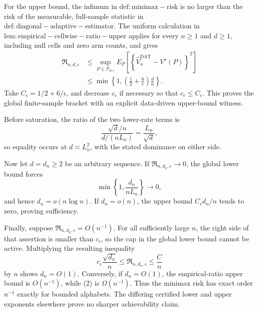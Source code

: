 For the upper bound, the infimum in \(\mathrm{def:minimax-risk}\) is no larger than the risk of the measurable, full-sample statistic in \(\mathrm{def:diagonal-adaptive-estimator}\).  The uniform calculation in \(\mathrm{lem:empirical-cellwise-ratio-upper}\) applies for every \(n\geq1\) and \(d\geq1\), including null cells and zero arm counts, and gives
\[
\begin{aligned}
 \mathfrak R_{n,d,\epsilon}
 &\leq\sup_{P\in\mathcal P_{d,\epsilon}}
 E_P\!\left[
  \left\{\widehat V_n^{\mathrm{DAT}}-V^\star(P)\right\}^2
 \right]\\
 &\leq\min\!\left\{1,
  \left(\frac12+\frac6\epsilon\right)\frac dn
 \right\}.
\end{aligned}
\]
Take \(C_\epsilon=1/2+6/\epsilon\), and decrease \(c_\epsilon\) if necessary so that \(c_\epsilon\leq C_\epsilon\).  This proves the global finite-sample bracket with an explicit data-driven upper-bound witness.

Before saturation, the ratio of the two lower-rate terms is
\[
 \frac{\sqrt d/n}{d/(nL_n)}=\frac{L_n}{\sqrt d},
\]
so equality occurs at \(d\asymp L_n^2\), with the stated dominance on either side.

Now let \(d=d_n\geq2\) be an arbitrary sequence.  If \(\mathfrak R_{n,d_n,\epsilon}\to0\), the global lower bound forces
\[
 \min\left\{1,\frac{d_n}{nL_n}\right\}\longrightarrow0,
\]
and hence \(d_n=o(n\log n)\).  If \(d_n=o(n)\), the upper bound \(C_\epsilon d_n/n\) tends to zero, proving sufficiency.

Finally, suppose \(\mathfrak R_{n,d_n,\epsilon}=O(n^{-1})\).  For all sufficiently large \(n\), the right side of that assertion is smaller than \(c_\epsilon\), so the cap in the global lower bound cannot be active.  Multiplying the resulting inequality
\[
 c_\epsilon\frac{\sqrt{d_n}}n
 \leq\mathfrak R_{n,d_n,\epsilon}
 \leq\frac Cn
\]
by \(n\) shows \(d_n=O(1)\).  Conversely, if \(d_n=O(1)\), the empirical-ratio upper bound is \(O(n^{-1})\), while (2) is \(\Omega(n^{-1})\).  Thus the minimax risk has exact order \(n^{-1}\) exactly for bounded alphabets.  The differing certified lower and upper exponents elsewhere prove no sharper achievability claim.